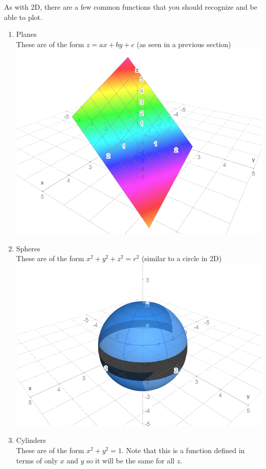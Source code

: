 \documentclass[11pt, fleqn]{article}
\begin{document}
As with 2D, there are a few common functions that you should recognize and be able to plot.
\begin{enumerate}
    \item Planes\\
    These are of the form $z=ax+by+c$ (as seen in a previous section)\\
    \includegraphics[scale=0.5]{Math217Pictures/planeGraph.png}
    \item Spheres\\
    These are of the form $x^2+y^2+z^2=r^2$ (similar to a circle in 2D)\\
    \includegraphics[scale=0.5]{Math217Pictures/sphereGraph.png}
    \item Cylinders\\
    These are of the form $x^2+y^2=1$. Note that this is a function defined in terms of only $x$ and $y$ so it will be the same for all $z$.\\

\end{enumerate}
\end{document}
